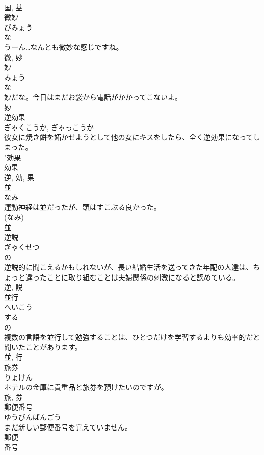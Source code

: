 \documentclass[8pt]{extreport}
\begin{document}
\begin{CJK}{UTF8}{min}
\\	国, 益	
\\	微妙	
\\	びみょう	
\\	な 
\\	うーん…なんとも微妙な感じですね。	
\\	微, 妙	
\\	妙	
\\	みょう	
\\	な 
\\	妙だな。今日はまだお袋から電話がかかってこないよ。	
\\	妙	
\\	逆効果	
\\	ぎゃくこうか, ぎゃっこうか	
\\	彼女に焼き餅を妬かせようとして他の女にキスをしたら、全く逆効果になってしまった。	
\\	"効果 
\\	効果 
\\	逆, 効, 果	
\\	並	
\\	なみ	
\\	運動神経は並だったが、頭はすこぶる良かった。	
\\	(なみ) 
\\	並	
\\	逆説	
\\	ぎゃくせつ	
\\	の 
\\	逆説的に聞こえるかもしれないが、長い結婚生活を送ってきた年配の人達は、ちょっと違ったことに取り組むことは夫婦関係の刺激になると認めている。	
\\	逆, 説	
\\	並行	
\\	へいこう	
\\	する 
\\	の 
\\	複数の言語を並行して勉強することは、ひとつだけを学習するよりも効率的だと聞いたことがあります。	
\\	並, 行	
\\	旅券	
\\	りょけん	
\\	ホテルの金庫に貴重品と旅券を預けたいのですが。	
\\	旅, 券	
\\	郵便番号	
\\	ゆうびんばんごう	
\\	まだ新しい郵便番号を覚えていません。	
\\	郵便 
\\	番号 

\end{CJK}
\end{document}
